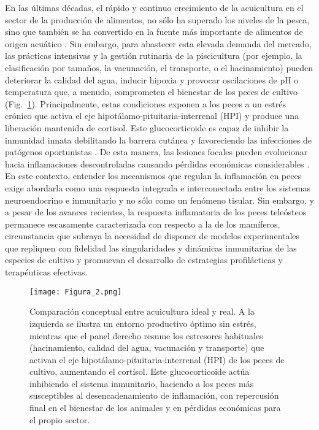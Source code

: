 \documentclass[10pt,a4paper]{article}
\begin{document}
En las últimas décadas, el rápido y continuo crecimiento de la acuicultura en el sector de la producción de alimentos, no sólo ha superado los niveles de la pesca, sino que también se ha convertido en la fuente más importante de alimentos de origen acuático \parencite{FAO2024}. Sin embargo, para abastecer esta elevada demanda del mercado, las prácticas intensivas y la gestión rutinaria de la piscicultura (por ejemplo, la clasificación por tamaños, la vacunación, el transporte, o el hacinamiento) pueden deteriorar la calidad del agua, inducir hipoxia y provocar oscilaciones de pH o temperatura que, a menudo, comprometen el bienestar de los peces de cultivo \parencite{Saraiva2022} (Fig.~\ref{fig:2}). Principalmente, estas condiciones exponen a los peces a un estrés crónico que activa el eje hipotálamo-pituitaria-interrenal (HPI) y produce una liberación mantenida de cortisol. Este glucocorticoide es capaz de inhibir la inmunidad innata debilitando la barrera cutánea y favoreciendo las infecciones de patógenos oportunistas \parencite{Azeredo2022}. De esta manera, las lesiones focales pueden evolucionar hacia inflamaciones descontroladas causando pérdidas económicas considerables \parencite{Balcazar2006,Esteban2012}. En este contexto, entender los mecanismos que regulan la inflamación en peces exige abordarla como una respuesta integrada e interconectada entre los sistemas neuroendocrino e inmunitario y no sólo como un fenómeno tisular. Sin embargo, y a pesar de los avances recientes, la respuesta inflamatoria de los peces teleósteos permanece escasamente caracterizada con respecto a la de los mamíferos, circunstancia que subraya la necesidad de disponer de modelos experimentales que repliquen con fidelidad las singularidades y dinámicas inmunitarias de las especies de cultivo y promuevan el desarrollo de estrategias profilácticas y terapéuticas efectivas.


\begin{figure}[ht]
  \centering
   \texttt{[image: Figura\_2.png]}

  \caption{Comparación conceptual entre acuicultura ideal y real. A la izquierda se ilustra un entorno productivo óptimo sin estrés, mientras que el panel derecho resume los estresores habituales (hacinamiento, calidad del agua, vacunación y transporte) que activan el eje hipotálamo-pituitaria-interrenal (HPI) de los peces de cultivo, aumentando el cortisol. Este glucocorticoide actúa inhibiendo el sistema inmunitario, haciendo a los peces más susceptibles al desencadenamiento de inflamación, con repercusión final en el bienestar de los animales y en pérdidas económicas para el propio sector.}
  \label{fig:2}
\end{figure}
\end{document}
